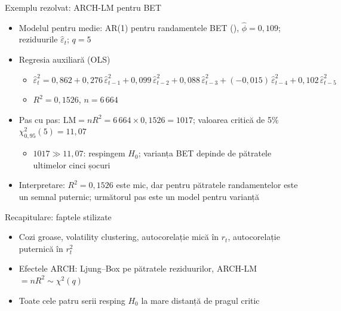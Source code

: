 \begin{frame}{Exemplu rezolvat: ARCH-LM pentru BET}
\itemsize{\footnotesize}
\begin{itemize}
    \item Modelul pentru medie: AR(1) pentru randamentele BET (), $\hat\phi = 0{,}109$; reziduurile $\hat\varepsilon_t$; $q = 5$
    \item Regresia auxiliară (OLS)
    \begin{itemize}
        \item $\hat\varepsilon_t^2 = 0{,}862 + 0{,}276\,\hat\varepsilon_{t-1}^2 + 0{,}099\,\hat\varepsilon_{t-2}^2 + 0{,}088\,\hat\varepsilon_{t-3}^2 + (\ensuremath{-}0{,}015)\,\hat\varepsilon_{t-4}^2 + 0{,}102\,\hat\varepsilon_{t-5}^2$
        \item $R^2 = 0{,}1526$, $n = 6\,664$
    \end{itemize}
    \item Pas cu pas: $\mathrm{LM} = n R^2 = 6\,664 \times 0{,}1526 = 1017$; valoarea critică de 5\% $\chi^2_{0{,}95}(5) = 11{,}07$
    \begin{itemize}
        \item $1017 \gg 11{,}07$: respingem $H_0$; varianța BET depinde de pătratele ultimelor cinci șocuri
    \end{itemize}
    \item Interpretare: $R^2 = 0{,}1526$ este mic, dar pentru pătratele randamentelor este un semnal puternic; următorul pas este un model pentru varianță
\end{itemize}
\end{frame}

\begin{frame}{Recapitulare: faptele stilizate}
\itemsize{\small}
\begin{itemize}
    \item Cozi groase, volatility clustering, autocorelație mică în $r_t$, autocorelație puternică în $r_t^2$
    \item Efectele ARCH: Ljung--Box pe pătratele reziduurilor, ARCH-LM $= nR^2 \sim \chi^2(q)$
    \item Toate cele patru serii resping $H_0$ la mare distanță de pragul critic
\end{itemize}
\end{frame}


